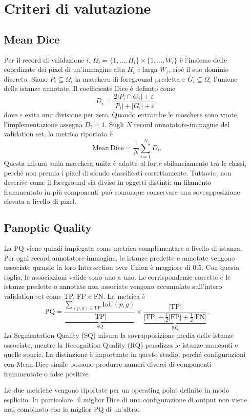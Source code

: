 \section{Criteri di valutazione}
\label{sec:background}

\subsection{Mean Dice}

Per il record di validazione $i$, $\Omega_i=\{1,\ldots,H_i\}\times
\{1,\ldots,W_i\}$ è l'insieme delle coordinate dei pixel di un'immagine alta $H_i$ e
larga $W_i$, cioè il suo dominio discreto. Siano $P_i\subseteq\Omega_i$ la maschera di
foreground predetta e $G_i\subseteq\Omega_i$ l'unione delle istanze annotate. Il
coefficiente Dice è definito come
\begin{equation}
D_i=\frac{2|P_i\cap G_i|+\varepsilon}
{|P_i|+|G_i|+\varepsilon},
\end{equation}
dove $\varepsilon$ evita una divisione per zero. Quando entrambe le maschere sono vuote,
l'implementazione assegna $D_i=1$. Sugli $N$ record annotatore-immagine del validation
set, la metrica riportata è
\begin{equation}
\mathrm{Mean\ Dice}=\frac{1}{N}\sum_{i=1}^{N}D_i.
\end{equation}
Questa misura sulla maschera unita è adatta al forte sbilanciamento tra le classi, perché
non premia i pixel di sfondo classificati correttamente. Tuttavia, non descrive come il
foreground sia diviso in oggetti distinti: un filamento frammentato in più componenti
può comunque conservare una sovrapposizione elevata a livello di pixel.

\subsection{Panoptic Quality}

La PQ viene quindi impiegata come metrica complementare a livello di istanza. Per ogni
record annotatore-immagine, le istanze predette e annotate vengono associate quando la
loro Intersection over Union è maggiore di 0.5. Con questa soglia, le associazioni valide
sono uno a uno. Le corrispondenze corrette e le istanze predette o annotate non associate
vengono accumulate sull'intero validation set come TP, FP e FN. La metrica è
\begin{equation}
\mathrm{PQ}=
\underbrace{\frac{\sum_{(p,g)\in\mathrm{TP}}\mathrm{IoU}(p,g)}{|\mathrm{TP}|}}_{\mathrm{SQ}}
\times
\underbrace{\frac{|\mathrm{TP}|}{|\mathrm{TP}|+\tfrac12|\mathrm{FP}|+\tfrac12|\mathrm{FN}|}}_{\mathrm{RQ}}.
\end{equation}
La Segmentation Quality (SQ) misura la sovrapposizione media delle istanze associate,
mentre la Recognition Quality (RQ) penalizza le istanze mancanti e quelle spurie. La
distinzione è importante in questo studio, perché configurazioni con Mean Dice simile
possono produrre numeri diversi di componenti frammentate o false positive.

Le due metriche vengono riportate per un operating point definito in modo esplicito. In
particolare, il miglior Dice di una configurazione di output non viene mai combinato con
la miglior PQ di un'altra.
